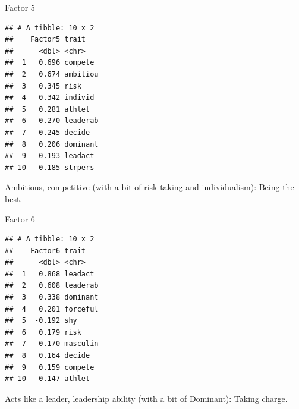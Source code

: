 \documentclass[
  ignorenonframetext,
]{beamer}
\newenvironment{Shaded}{\begin{snugshade}}{\end{snugshade}}
\newcommand{\DecValTok}[1]{\textcolor[rgb]{0.00,0.00,0.81}{#1}}
\newcommand{\KeywordTok}[1]{\textcolor[rgb]{0.13,0.29,0.53}{\textbf{#1}}}
\newcommand{\NormalTok}[1]{#1}
\newcommand{\OperatorTok}[1]{\textcolor[rgb]{0.81,0.36,0.00}{\textbf{#1}}}
\newcommand{\StringTok}[1]{\textcolor[rgb]{0.31,0.60,0.02}{#1}}
\begin{document}
\begin{frame}[fragile]{Factor 5}
\protect\hypertarget{factor-5}{}

\footnotesize

\begin{Shaded}
\end{Shaded}

\begin{verbatim}
## # A tibble: 10 x 2
##    Factor5 trait   
##      <dbl> <chr>   
##  1   0.696 compete 
##  2   0.674 ambitiou
##  3   0.345 risk    
##  4   0.342 individ 
##  5   0.281 athlet  
##  6   0.270 leaderab
##  7   0.245 decide  
##  8   0.206 dominant
##  9   0.193 leadact 
## 10   0.185 strpers
\end{verbatim}

\normalsize

Ambitious, competitive (with a bit of risk-taking and individualism):
Being the best.

\end{frame}

\begin{frame}[fragile]{Factor 6}
\protect\hypertarget{factor-6}{}

\footnotesize

\begin{Shaded}
\end{Shaded}

\begin{verbatim}
## # A tibble: 10 x 2
##    Factor6 trait   
##      <dbl> <chr>   
##  1   0.868 leadact 
##  2   0.608 leaderab
##  3   0.338 dominant
##  4   0.201 forceful
##  5  -0.192 shy     
##  6   0.179 risk    
##  7   0.170 masculin
##  8   0.164 decide  
##  9   0.159 compete 
## 10   0.147 athlet
\end{verbatim}

\normalsize

Acts like a leader, leadership ability (with a bit of Dominant): Taking
charge.

\end{frame}
\end{document}
